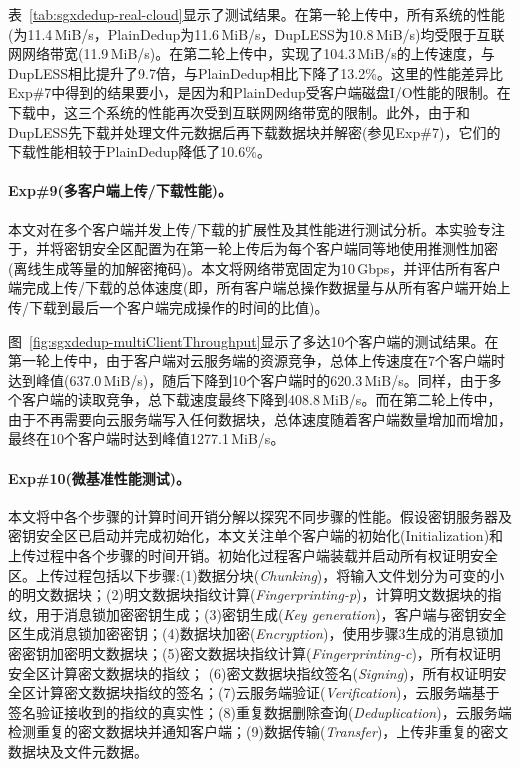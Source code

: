 表~\ref{tab:sgxdedup-real-cloud}显示了测试结果。在第一轮上传中，所有系统的性能(\sysnameS 为11.4\,MiB/s，PlainDedup为11.6\,MiB/s，DupLESS为10.8\,MiB/s)均受限于互联网网络带宽(11.9\,MiB/s)。在第二轮上传中，\sysnameS 实现了104.3\,MiB/s的上传速度，与DupLESS相比提升了9.7倍，与PlainDedup相比下降了13.2\%。这里的性能差异比Exp\#7中得到的结果要小，是因为\sysnameS 和PlainDedup受客户端磁盘I/O性能的限制。在下载中，这三个系统的性能再次受到互联网网络带宽的限制。此外，由于\sysnameS 和DupLESS先下载并处理文件元数据后再下载数据块并解密(参见Exp\#7)，它们的下载性能相较于PlainDedup降低了10.6\%。

\paragraph*{Exp\#9(多客户端上传/下载性能)。}本文对\sysnameS 在多个客户端并发上传/下载的扩展性及其性能进行测试分析。本实验专注于\sysnameS，并将密钥安全区配置为在第一轮上传后为每个客户端同等地使用推测性加密(离线生成等量的加解密掩码)。本文将网络带宽固定为10\,Gbps，并评估所有客户端完成上传/下载的总体速度(即，所有客户端总操作数据量与从所有客户端开始上传/下载到最后一个客户端完成操作的时间的比值)。

图~\ref{fig:sgxdedup-multiClientThroughput}显示了多达10个客户端的测试结果。在第一轮上传中，由于客户端对云服务端的资源竞争，总体上传速度在7个客户端时达到峰值(637.0\,MiB/s)，随后下降到10个客户端时的620.3\,MiB/s。同样，由于多个客户端的读取竞争，总下载速度最终下降到408.8\,MiB/s。而在第二轮上传中，由于不再需要向云服务端写入任何数据块，总体速度随着客户端数量增加而增加，最终在10个客户端时达到峰值1277.1\,MiB/s。

\paragraph*{Exp\#10(微基准性能测试)。}本文将\sysnameS 中各个步骤的计算时间开销分解以探究不同步骤的性能。假设密钥服务器及密钥安全区已启动并完成初始化，本文关注单个客户端的初始化(Initialization)和上传过程中各个步骤的时间开销。初始化过程客户端装载并启动所有权证明安全区。上传过程包括以下步骤:(1)数据分块(\textit{Chunking})，将输入文件划分为可变的小的明文数据块；(2)明文数据块指纹计算(\textit{Fingerprinting-p})，计算明文数据块的指纹，用于消息锁加密密钥生成；(3)密钥生成(\textit{Key generation})，客户端与密钥安全区生成消息锁加密密钥；(4)数据块加密(\textit{Encryption})，使用步骤3生成的消息锁加密密钥加密明文数据块；(5)密文数据块指纹计算(\textit{Fingerprinting-c})，所有权证明安全区计算密文数据块的指纹； (6)密文数据块指纹签名(\textit{Signing})，所有权证明安全区计算密文数据块指纹的签名；(7)云服务端验证(\textit{Verification})，云服务端基于签名验证接收到的指纹的真实性；(8)重复数据删除查询(\textit{Deduplication})，云服务端检测重复的密文数据块并通知客户端；(9)数据传输(\textit{Transfer})，上传非重复的密文数据块及文件元数据。

